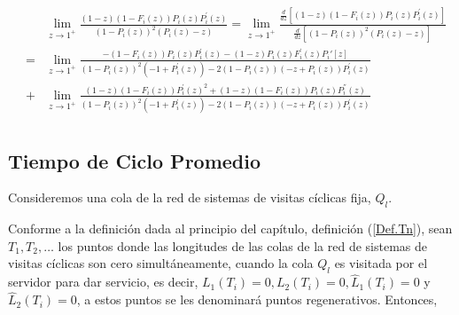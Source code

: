 \begin{eqnarray*}
&&\lim_{z\rightarrow1^{+}}\frac{\left(1-z\right)\left(1-F_{i}\left(z\right)\right)P_{i}\left(z\right)P_{i}^{'}\left(z\right)}{\left(1-P_{i}\left(z\right)\right)^{2}\left(P_{i}\left(z\right)-z\right)}=\lim_{z\rightarrow1^{+}}\frac{\frac{d}{dz}\left[\left(1-z\right)\left(1-F_{i}\left(z\right)\right)P_{i}\left(z\right)P_{i}^{'}\left(z\right)\right]}{\frac{d}{dz}\left[\left(1-P_{i}\left(z\right)\right)^{2}\left(P_{i}\left(z\right)-z\right)\right]}\\
&=&\lim_{z\rightarrow1^{+}}\frac{-\left(1-F_{i}\left(z\right)\right) P_{i}\left(z\right) P_{i}^{'}\left(z\right)-(1-z) P_{i}\left(z\right) F_{i}^{'}\left(z\right)P_i'[z]}{\left(1-P_{i}\left(z\right)\right)^2 \left(-1+P_{i}^{'}\left(z\right)\right)-2 \left(1-P_{i}\left(z\right)\right) \left(-z+P_{i}\left(z\right)\right) P_{i}^{'}\left(z\right)}\\
&+&\lim_{z\rightarrow1^{+}}\frac{(1-z) \left(1-F_{i}\left(z\right)\right) P_{i}^{'}\left(z\right)^2+(1-z) \left(1-F_{i}\left(z\right)\right) P_{i}\left(z\right) P_{i}^{''}\left(z\right)}{\left(1-P_{i}\left(z\right)\right)^2 \left(-1+P_{i}^{'}\left(z\right)\right)-2 \left(1-P_{i}\left(z\right)\right) \left(-z+P_{i}\left(z\right)\right) P_{i}^{'}\left(z\right)}\\
\end{eqnarray*}




\subsection{Tiempo de Ciclo Promedio}

Consideremos una cola de la red de sistemas de visitas c\'iclicas fija, $Q_{l}$.


Conforme a la definici\'on dada al principio del cap\'itulo, definici\'on (\ref{Def.Tn}), sean $T_{1},T_{2},\ldots$ los puntos donde las longitudes de las colas de la red de sistemas de visitas c\'iclicas son cero simult\'aneamente, cuando la cola $Q_{l}$ es visitada por el servidor para dar servicio, es decir, $L_{1}\left(T_{i}\right)=0,L_{2}\left(T_{i}\right)=0,\hat{L}_{1}\left(T_{i}\right)=0$ y $\hat{L}_{2}\left(T_{i}\right)=0$, a estos puntos se les denominar\'a puntos regenerativos. Entonces, 

